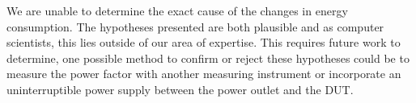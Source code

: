 We are unable to determine the exact cause of the changes in energy consumption. The hypotheses presented are both plausible and as computer scientists, this lies outside of our area of expertise. This requires future work to determine, one possible method to confirm or reject these hypotheses could be to measure the power factor with another measuring instrument or incorporate an uninterruptible power supply between the power outlet and the DUT.

